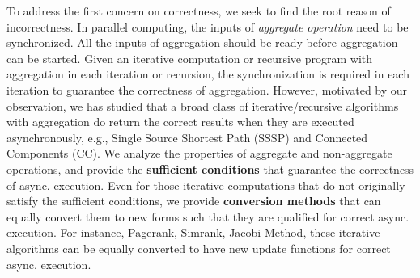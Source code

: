 To address the first concern on correctness, we seek to find the root reason of incorrectness. In parallel computing, the inputs of \textit{aggregate operation} need to be synchronized. All the inputs of aggregation should be ready before aggregation can be started. Given an iterative computation or recursive program with aggregation in each iteration or recursion, the synchronization is required in each iteration to guarantee the correctness of aggregation. However, motivated by our observation, we has studied that a broad class of iterative/recursive algorithms with aggregation do return the correct results when they are executed asynchronously, e.g., Single Source Shortest Path (SSSP) and Connected Components (CC). We analyze the properties of aggregate and non-aggregate operations, and provide the \textbf{sufficient conditions} that guarantee the correctness of async. execution. Even for those iterative computations that do not originally satisfy the sufficient conditions, we provide \textbf{conversion methods} that can equally convert them to new forms such that they are qualified for correct async. execution. For instance, Pagerank, Simrank, Jacobi Method, these iterative algorithms can be equally converted to have new update functions for correct async. execution.



